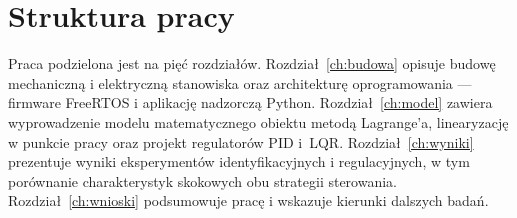 \section{Struktura pracy}

Praca podzielona jest na pięć rozdziałów.
Rozdział~\ref{ch:budowa} opisuje budowę mechaniczną i elektryczną stanowiska
oraz architekturę oprogramowania — firmware FreeRTOS i aplikację nadzorczą Python.
Rozdział~\ref{ch:model} zawiera wyprowadzenie modelu matematycznego obiektu
metodą Lagrange'a, linearyzację w punkcie pracy oraz projekt regulatorów PID i~LQR.
Rozdział~\ref{ch:wyniki} prezentuje wyniki eksperymentów identyfikacyjnych i regulacyjnych,
w tym porównanie charakterystyk skokowych obu strategii sterowania.
Rozdział~\ref{ch:wnioski} podsumowuje pracę i wskazuje kierunki dalszych badań.

